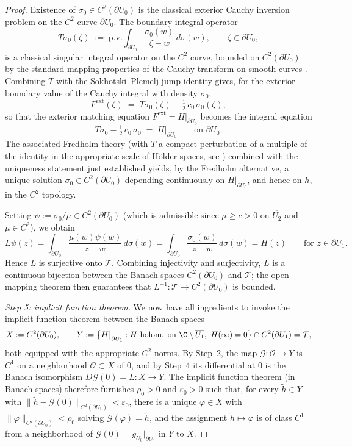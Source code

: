 \begin{proof}
Existence of \(\sigma_0\in C^2(\partial U_0)\) is the classical exterior
Cauchy inversion problem on the \(C^2\) curve \(\partial U_0\). The
boundary integral operator
\[
T\sigma_0(\zeta)
\;:=\;\mathrm{p.v.}\!\int_{\partial U_0}
\frac{\sigma_0(w)}{\zeta-w}\,d\sigma(w),\qquad \zeta\in\partial U_0,
\]
is a classical singular integral operator on the \(C^2\) curve, bounded on
\(C^2(\partial U_0)\) by the standard mapping properties of the Cauchy
transform on smooth curves \cite[Ch.~III]{Garnett}. Combining \(T\) with
the Sokhotski--Plemelj jump identity gives, for the exterior boundary
value of the Cauchy integral with density \(\sigma_0\),
\[
F^{\mathrm{ext}}(\zeta)\;=\;
T\sigma_0(\zeta)-\tfrac{1}{2}\,c_0\,\sigma_0(\zeta),
\]
so that the exterior matching equation
\(F^{\mathrm{ext}}=H|_{\partial U_0}\) becomes the integral equation
\[
T\sigma_0-\tfrac{1}{2}\,c_0\,\sigma_0
\;=\;H\big|_{\partial U_0}
\qquad \text{on }\partial U_0.
\]
The associated Fredholm theory (with \(T\) a compact perturbation of a
multiple of the identity in the appropriate scale of H\"older spaces, see
\cite[Ch.~III]{Garnett}) combined with the uniqueness statement just
established yields, by the Fredholm alternative, a unique solution
\(\sigma_0\in C^2(\partial U_0)\) depending continuously on
\(H|_{\partial U_0}\), and hence on \(h\), in the \(C^2\) topology.

Setting \(\psi:=\sigma_0/\mu\in C^2(\partial U_0)\) (which is admissible
since \(\mu\geq c>0\) on \(\overline{U_2}\) and \(\mu\in C^2\)), we obtain
\[
L\psi(z)
=\int_{\partial U_0}\frac{\mu(w)\psi(w)}{z-w}\,d\sigma(w)
=\int_{\partial U_0}\frac{\sigma_0(w)}{z-w}\,d\sigma(w)
=H(z)
\qquad \text{for }z\in \partial U_1.
\]
Hence \(L\) is surjective onto \(\mathcal{T}\). Combining injectivity and
surjectivity, \(L\) is a continuous bijection between the Banach spaces
\(C^2(\partial U_0)\) and \(\mathcal{T}\); the open mapping theorem then
guarantees that \(L^{-1}\colon \mathcal{T}\to C^2(\partial U_0)\) is
bounded.

\medskip
\noindent\emph{Step 5: implicit function theorem.}
We now have all ingredients to invoke the implicit function theorem
between the Banach spaces
\[
X:=C^2(\partial U_0),\qquad
Y:=\bigl\{H\big|_{\partial U_1}:H\text{ holom. on }
\C\setminus \overline{U_1},\ H(\infty)=0\bigr\}\cap C^2(\partial U_1)
=\mathcal{T},
\]
both equipped with the appropriate \(C^2\) norms. By Step~2, the map
\(\mathcal{G}\colon\mathcal{O}\to Y\) is \(C^1\) on a neighborhood
\(\mathcal{O}\subset X\) of \(0\), and by Step~4 its differential at
\(0\) is the Banach isomorphism \(D\mathcal{G}(0)=L:X\to Y\). The
implicit function theorem (in Banach spaces) therefore furnishes
\(\rho_0>0\) and \(\varepsilon_0>0\) such that, for every
\(\widetilde h\in Y\) with
\(\|\widetilde h-\mathcal{G}(0)\|_{C^2(\partial U_1)}<\varepsilon_0\),
there is a unique \(\varphi\in X\) with
\(\|\varphi\|_{C^2(\partial U_0)}<\rho_0\) solving
\(\mathcal{G}(\varphi)=\widetilde h\), and the assignment
\(\widetilde h\mapsto \varphi\) is of class \(C^1\) from a
neighborhood of \(\mathcal{G}(0)=g_{U_0}|_{\partial U_1}\) in \(Y\) to
\(X\).


\end{proof}
